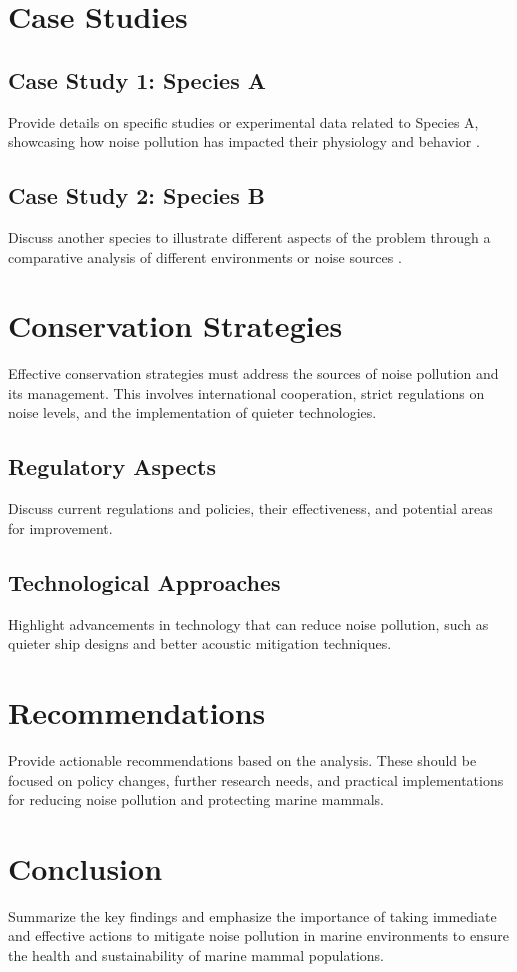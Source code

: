 \documentclass[12pt]{article}
\begin{document}
\section{Case Studies}
\subsection{Case Study 1: Species A}
Provide details on specific studies or experimental data related to Species A, showcasing how noise pollution has impacted their physiology and behavior \citep{FieldStudySpeciesA2019}.

\subsection{Case Study 2: Species B}
Discuss another species to illustrate different aspects of the problem through a comparative analysis of different environments or noise sources \citep{FieldStudySpeciesB2020}.

\section{Conservation Strategies}
Effective conservation strategies must address the sources of noise pollution and its management. This involves international cooperation, strict regulations on noise levels, and the implementation of quieter technologies.
\subsection{Regulatory Aspects}
Discuss current regulations and policies, their effectiveness, and potential areas for improvement.

\subsection{Technological Approaches}
Highlight advancements in technology that can reduce noise pollution, such as quieter ship designs and better acoustic mitigation techniques.

\section{Recommendations}
Provide actionable recommendations based on the analysis. These should be focused on policy changes, further research needs, and practical implementations for reducing noise pollution and protecting marine mammals.

\section{Conclusion}
Summarize the key findings and emphasize the importance of taking immediate and effective actions to mitigate noise pollution in marine environments to ensure the health and sustainability of marine mammal populations.



\end{document}
